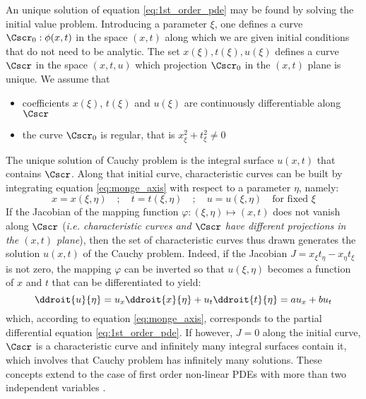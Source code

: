 An unique solution of equation \eqref{eq:1st_order_pde} may be found by solving the initial value problem. Introducing a parameter $\xi$, one defines a curve $\Cscr_0:\phi(x,t)$ in the space $(x,t)$ along which we are given initial conditions that do not need to be analytic. The set $x(\xi),t(\xi),u(\xi)$ defines a curve $\Cscr$ in the space $(x,t,u)$ which projection $\Cscr_0$ in the $(x,t)$ plane is unique. We assume that
\begin{itemize}
\item coefficients $x(\xi)$, $t(\xi)$ and $u(\xi)$ are continuously differentiable along $\Cscr$
\item the curve $\Cscr_0$ is regular, that is $x_\xi^2 + t_\xi^2 \neq 0$
\end{itemize}
The unique solution of Cauchy problem is the integral surface $u(x,t)$ that contains $\Cscr$.
Along that initial curve, characteristic curves can be built by integrating equation \eqref{eq:monge_axis} with respect to a parameter $\eta$, namely:
\begin{equation}
  \label{eq:charac_on_C}
  x=x(\xi,\eta) \quad ; \quad t=t(\xi,\eta) \quad ; \quad u=u(\xi,\eta) \quad \text{for fixed } \xi
\end{equation}
If the Jacobian of the mapping function $\varphi:(\xi,\eta) \mapsto (x,t)$ does not vanish along $\Cscr$ (\textit{i.e. characteristic curves and $\Cscr$ have different projections in the $(x,t)$ plane}), then the set of characteristic curves thus drawn generates the solution $u(x,t)$ of the Cauchy problem. Indeed, if the Jacobian $J=x_\xi t_\eta - x_\eta t_\xi$ is not zero, the mapping $\varphi$ can be inverted so that $u(\xi,\eta)$ becomes a function of $x$ and $t$ that can be differentiated to yield:
\begin{equation*}
  \ddroit{u}{\eta}= u_x \ddroit{x}{\eta} + u_t \ddroit{t}{\eta} =  a u_x + b u_t
\end{equation*}
which, according to equation \eqref{eq:monge_axis}, corresponds to the partial differential equation \eqref{eq:1st_order_pde}. If however, $J=0$ along the initial curve, $\Cscr$ is a characteristic curve and infinitely many integral surfaces contain it, which involves that Cauchy problem has infinitely many solutions. These concepts extend to the case of first order non-linear PDEs with more than two independent variables \cite[Chapter~2]{Courant}.


